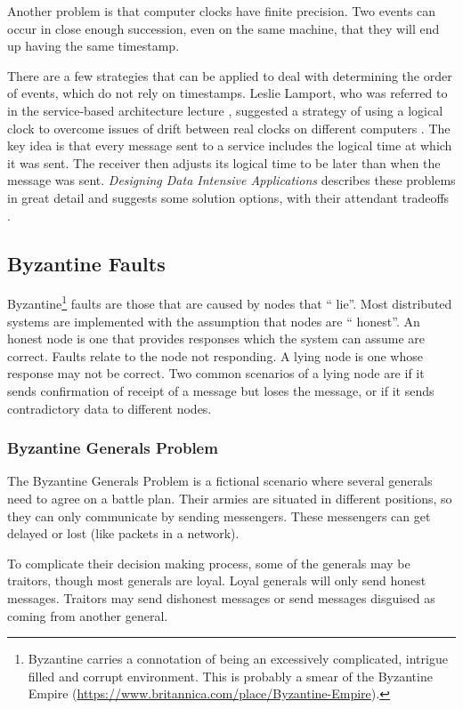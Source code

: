 Another problem is that computer clocks have finite precision.
Two events can occur in close enough succession, even on the same machine, that they will end up having the same timestamp.

There are a few strategies that can be applied to deal with determining the order of events, which do not rely on timestamps.
Leslie Lamport, who was referred to in the service-based architecture lecture \cite{service-based-slides},
suggested a strategy of using a logical clock to overcome issues of drift
between real clocks on different computers \cite{LamportLeslie1978Tcat}.
The key idea is that every message sent to a service includes the logical time at which it was sent.
The receiver then adjusts its logical time to be later than when the message was sent.
\textit{Designing Data Intensive Applications} describes these problems in great detail
and suggests some solution options, with their attendant tradeoffs \cite{data-intensive}.

\subsection{Byzantine Faults}\label{sec:byzantine}

Byzantine\footnote{Byzantine carries a connotation of being an excessively complicated, intrigue filled and corrupt environment.
This is probably a smear of the Byzantine Empire (\url{https://www.britannica.com/place/Byzantine-Empire}).}
faults are those that are caused by nodes that `` lie''.
Most distributed systems are implemented with the assumption that nodes are `` honest''.
An honest node is one that provides responses which the system can assume are correct.
Faults relate to the node not responding.
A lying node is one whose response may not be correct.
Two common scenarios of a lying node are if it sends confirmation of receipt of a message but loses the message,
or if it sends contradictory data to different nodes.

\subsubsection*{Byzantine Generals Problem}
The Byzantine Generals Problem \cite{byzantine-generals} is a fictional scenario where several generals need to agree on a battle plan.
Their armies are situated in different positions, so they can only communicate by sending messengers.
These messengers can get delayed or lost (like packets in a network).

To complicate their decision making process, some of the generals may be traitors,
though most generals are loyal.
Loyal generals will only send honest messages.
Traitors may send dishonest messages or send messages disguised as coming from another general.

